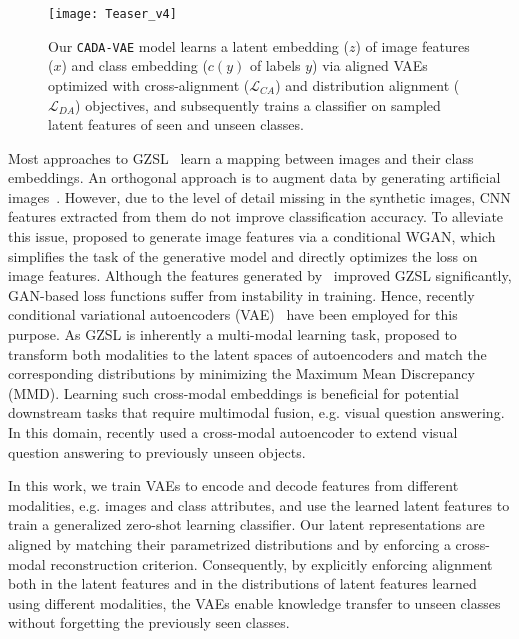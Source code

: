 \documentclass[10pt,twocolumn,letterpaper]{article}
\begin{document}
\begin{figure}[t]
\centering
\texttt{[image: Teaser\_v4]}
\caption{Our \texttt{CADA-VAE} model learns a latent embedding ($z$) of image features ($x$) and class embedding ($c(y)$ of labels $y$) via aligned VAEs optimized with cross-alignment ($\mathcal{L}_{CA}$) and distribution alignment ($\mathcal{L}_{DA}$) objectives, and subsequently trains a classifier on sampled latent features of seen and unseen classes. }
\label{fig:teaser}
\end{figure}

Most approaches to GZSL~\cite{devise,ss,norouzi2013zero,latem,sje} learn a mapping between images and their class embeddings.
An orthogonal approach is to augment data by generating artificial images~\cite{reed}. However, due to the level of detail missing in the synthetic images, CNN features extracted from them do not improve classification accuracy. To alleviate this issue, \cite{featgen} proposed to generate image features via a conditional WGAN, which simplifies the task of the generative model and directly optimizes the loss on image features. Although the features generated by~\cite{featgen} improved GZSL significantly, GAN-based loss functions suffer from instability in training. Hence, recently conditional variational autoencoders (VAE)~\cite{cvae,segzsl} have been employed for this purpose. As GZSL is inherently a multi-modal learning task, \cite{tsai2017learning} proposed to transform both modalities to the latent spaces of autoencoders and match the corresponding distributions by minimizing the Maximum Mean Discrepancy (MMD).
Learning such cross-modal embeddings is beneficial for potential downstream tasks that require multimodal fusion, e.g. visual question answering. In this domain, \cite{ramakrishnan2017empirical} recently used a cross-modal autoencoder to extend visual question answering to previously unseen objects.

In this work, we train VAEs to encode and decode features from different modalities, e.g. images and class attributes, and use the learned latent features to train a generalized zero-shot learning classifier. Our latent representations are aligned by matching their parametrized distributions and by enforcing a cross-modal reconstruction criterion.
Consequently, by explicitly enforcing alignment both in the latent features and in the distributions of latent features learned using different modalities, the VAEs enable knowledge transfer to unseen classes without forgetting the previously seen classes.
\end{document}

